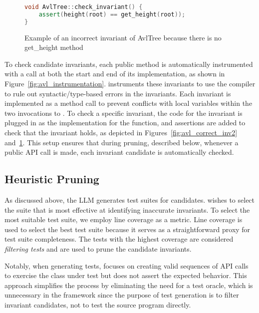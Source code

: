 \begin{figure}[htp]
\begin{lstlisting}[language=c++, escapechar=@]
void AvlTree::check_invariant() {
    assert(height(root) == get_height(root));
}
\end{lstlisting}
    \caption{Example of an incorrect invariant of AvlTree because there is no get\_height method}
    \label{fig:avl_incorrect}
\end{figure}

To check candidate invariants, each public method is automatically instrumented with a  call at both the start and end of its implementation, as shown in Figure~\ref{fig:avl_instrumentation}. \tech instruments these invariants to use the compiler to rule out syntactic/type-based errors in the invariants.
Each invariant is implemented as a method call to prevent conflicts with local variables within the two invocations to .
To check a specific invariant, the code for the invariant is plugged in as the implementation for the  function, and assertions are added to check that the invariant holds, as
depicted in Figures~\ref{fig:avl_correct_inv2} and~\ref{fig:avl_incorrect}. This setup ensures that during pruning, described below, whenever a public API call is made, each invariant candidate is automatically checked.



\subsection{Heuristic Pruning}
\label{sec:testing}

As discussed above, the LLM generates test suites for candidates.  \tech wishes to select the suite that is most effective at identifying inaccurate invariants. To select the most suitable test suite, we employ line coverage as a metric. Line coverage is used to select the best test suite because it serves as a straightforward proxy for test suite completeness. The tests with the highest coverage are considered \emph{filtering tests} and are used to prune the candidate invariants.


Notably, when generating tests, \tech focuses on creating valid sequences of API calls to exercise the class under test but does not assert the expected behavior. 
This approach simplifies the process by eliminating the need for a test oracle, which is unnecessary in the \tech framework since the purpose of test generation is to filter invariant candidates, not to test the source program directly.
 

